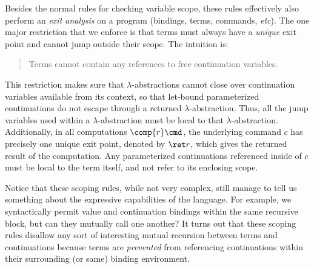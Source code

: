 \documentclass{article}
\begin{document}
Besides the normal rules for checking variable scope, these rules effectively
also perform an \emph{exit analysis} on a program (bindings, terms, commands,
\emph{etc}).  The one major restriction that we enforce is that terms must
always have a \emph{unique} exit point and cannot jump outside their scope.  The
intuition is:
\begin{quote}
  Terms cannot contain any references to free continuation variables.
\end{quote}
This restriction makes sure that $\lambda$-abstractions cannot close over
continuation variables available from its context, so that let-bound
parameterized continuations do not escape through a returned
$\lambda$-abstraction.  Thus, all the jump variables used within a
$\lambda$-abstraction must be local to that $\lambda$-abstraction.
Additionally, in all computations $\comp{r}\cmd$, the underlying command $c$ has
precisely one unique exit point, denoted by $\ret r$, which gives the returned
result of the computation.  Any parameterized continuations referenced inside of
$c$ must be local to the term itself, and not refer to its enclosing scope.


Notice that these scoping rules, while not very complex, still manage to tell us
something about the expressive capabilities of the language.  For example, we
syntactically permit value and continuation bindings within the same recursive
block, but can they mutually call one another?  It turns out that these scoping
rules disallow any sort of interesting mutual recursion between terms and
continuations because terms are \emph{prevented} from referencing continuations
within their surrounding (or same) binding environment.
\end{document}
